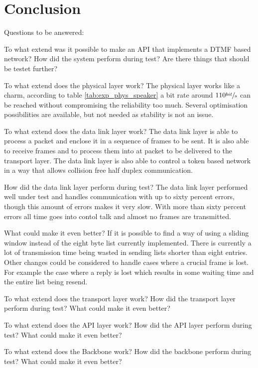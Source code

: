 \chapter{Conclusion}\label{chap:conclusion}
Questions to be answered:

To what extend was it possible to make an API that implements a DTMF based
network?
How did the system perform during test? 
Are there things that should be testet further?

To what extend does the physical layer work? 
The physical layer works like a charm, according to table \ref{tab:exp_phys_speaker} a bit rate around $110\sfrac{bit}{s}$ can be reached without compromising the reliability too much. Several optimisation possibilities are available, but not needed as stability is not an issue.

  To what extend does the data link layer work? 
The data link layer is able to process a packet and enclose it in a sequence of
frames to be sent. It is also able to receive frames and to process them into at
packet to be delivered to the transport layer. The data link layer is also able
to control a token based network in a way that allows collision free half duplex
communication. 

  How did the data link layer perform during test? The data link
layer performed well under test and handles communication with up to sixty
percent errors, though this amount of errors makes it very slow. With more than
sixty percent errors all time goes into contol talk and almost no frames are
transmitted.

  What could make it even better?
If it is possible to find a way of using a sliding window instead of the eight
byte list currently implemented. There is currently a lot of transmission time
being wasted in sending lists shorter than eight entries. Other changes could be
considered to handle cases where a crucial frame is lost. For example the case
where a reply is lost which results in some waiting time and the entire list
being resend.

To what extend does the transport layer work? 
How did the transport layer perform during test?
What could make it even better?

To what extend does the API layer work? 
How did the API layer perform during test?
What could make it even better?

To what extend does the Backbone work? 
How did the backbone perform during test?
What could make it even better?


